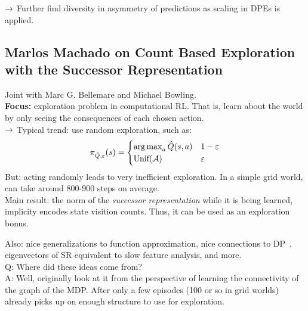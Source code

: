 $\rightarrow$ Further find diversity in asymmetry of predictions as scaling in DPEs is applied.

\spacerule


\subsection{Marlos Machado on Count Based Exploration with the Successor Representation}
\label{sec:mr}

Joint with Marc G. Bellemare and Michael Bowling. \\

{\bf Focus:} exploration problem in computational RL. That is, learn about the world by only seeing the consequences of each chosen action. \\

$\rightarrow$ Typical trend: use random exploration, such as:
\[
\pi_{\hat{Q},\varepsilon} (s) = \begin{cases}
\operatorname*{arg\,max}_a \hat{Q}(s,a)& 1-\varepsilon \\
\text{Unif}(\mathcal{A})& \varepsilon \\
\end{cases}
\]
But: acting randomly leads to very inefficient exploration. In a simple grid world, can take around 800-900 steps on average. \\

Main result: the norm of the {\it successor representation} while it is being learned, implicity encodes state visition counts. Thus, it can be used as an exploration bonus.

Also: nice generalizations to function approximation, nice connections to DP~\cite{wang2007dual}, eigenvectors of SR equivalent to slow feature analysis, and more. \\

Q: Where did these ideas come from? \\

A: Well, originally look at it from the perspective of learning the connectivity of the graph of the MDP. After only a few episodes (100 or so in grid worlds) already picks up on enough structure to use for exploration. \\

